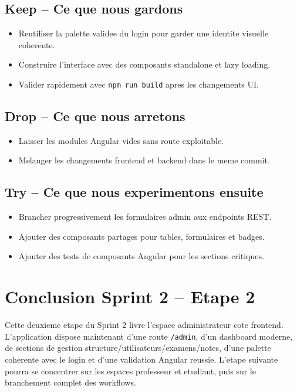 \documentclass[12pt,a4paper]{report}
\begin{document}
\subsection{Keep -- Ce que nous gardons}

\begin{itemize}[itemsep=0.3em]
    \item Reutiliser la palette validee du login pour garder une identite visuelle coherente.
    \item Construire l'interface avec des composants standalone et lazy loading.
    \item Valider rapidement avec \texttt{npm run build} apres les changements UI.
\end{itemize}

\subsection{Drop -- Ce que nous arretons}

\begin{itemize}[itemsep=0.3em]
    \item Laisser les modules Angular vides sans route exploitable.
    \item Melanger les changements frontend et backend dans le meme commit.
\end{itemize}

\subsection{Try -- Ce que nous experimentons ensuite}

\begin{itemize}[itemsep=0.3em]
    \item Brancher progressivement les formulaires admin aux endpoints REST.
    \item Ajouter des composants partages pour tables, formulaires et badges.
    \item Ajouter des tests de composants Angular pour les sections critiques.
\end{itemize}

\section{Conclusion Sprint 2 -- Etape 2}

Cette deuxieme etape du Sprint 2 livre l'espace administrateur cote frontend. L'application dispose maintenant d'une route \texttt{/admin}, d'un dashboard moderne, de sections de gestion structure/utilisateurs/examens/notes, d'une palette coherente avec le login et d'une validation Angular reussie. L'etape suivante pourra se concentrer sur les espaces professeur et etudiant, puis sur le branchement complet des workflows.
\end{document}
